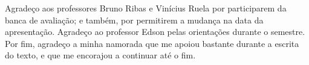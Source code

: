 \begin{agradecimentos}
    Agradeço aos professores Bruno Ribas e Vinícius Ruela por participarem da banca de avaliação; e também, por permitirem a mudança na data da apresentação. Agradeço ao professor Edson pelas orientações durante o semestre. Por fim, agradeço a minha namorada que me apoiou bastante durante a escrita do texto, e que me encorajou a continuar até o fim.
\end{agradecimentos}
